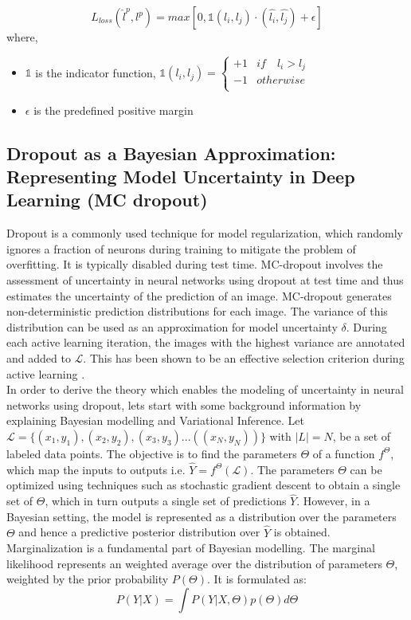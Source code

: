 \begin{equation}
    \label{equation:learning_loss_pair_wise_loss}
    L_{loss}(\hat{l}^{p}, l^{p}) = max [0, \mathbb{1}(l_i, l_j)\cdot(\hat{l_i}, \hat{l_j}) + \epsilon ]
\end{equation}
where,
\begin{itemize}[label={}]
  \setlength\itemsep{0em}
  \item $\mathbb{1}$ is the indicator function, $\mathbb{1}(l_i, l_j) = \begin{cases} 
      +1 & if \quad l_i > l_j \\
      -1 & otherwise \\
   \end{cases}$
   \item $\epsilon$ is the predefined positive margin
\end{itemize}

\subsection{Dropout as a Bayesian Approximation: Representing Model Uncertainty in Deep Learning (MC dropout)}
Dropout\cite{srivastava2014} is a commonly used technique for model regularization, which randomly ignores a fraction of neurons during training to mitigate the problem of overfitting. It is typically disabled during test time. MC-dropout involves the assessment of uncertainty in neural networks using dropout at test time \cite{gal2016, gal2016phd} and thus estimates the uncertainty of the prediction of an image. MC-dropout generates non-deterministic prediction distributions for each image. The variance of this distribution can be used as an approximation for model uncertainty $\delta$. During each active learning iteration, the images with the highest variance are annotated and added to $\mathcal{L}$. This has been shown to be an effective selection criterion during active learning \cite{gal2016}. \\
In order to derive the theory which enables the modeling of uncertainty in neural networks using dropout, lets start with some background information by explaining Bayesian modelling and Variational Inference. Let $\mathcal{L} = \{(x_1, y_1), (x_2, y_2), (x_3, y_3) ... ((x_N, y_N))\}$ with $|L| = N$, be a set of labeled data points. The objective is to find the parameters $\Theta$ of a function $f^\Theta$, which map the inputs to outputs i.e. $\hat{Y} = f^\Theta(\mathcal{L})$. The parameters $\Theta$ can be optimized using techniques such as stochastic gradient descent to obtain a single set of $\Theta$, which in turn outputs a single set of predictions $\hat{Y}$. However, in a Bayesian setting, the model is represented as a distribution over the parameters $\Theta$ and hence a predictive posterior distribution over $\hat{Y}$ is obtained. Marginalization is a fundamental part of Bayesian modelling. The marginal likelihood represents an weighted average over the distribution of parameters $\Theta$, weighted by the prior probability $P(\Theta)$. It is formulated as:
\begin{equation}
    \label{equation:marginal_likelihood_mc_dropout}
    P(Y | X) = \int P(Y | X, \Theta) p(\Theta) d\Theta
\end{equation}

